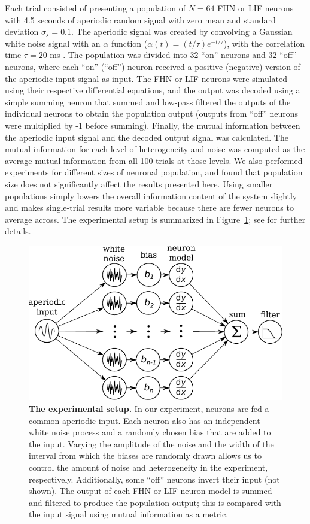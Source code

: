 \documentclass[12pt]{article}
\begin{document}
Each trial consisted of presenting a population of $N = 64$ FHN or LIF neurons with 4.5 seconds of aperiodic random signal with zero mean and standard deviation $\sigma_s = 0.1$.
The aperiodic signal was created by convolving a Gaussian white noise signal with an $\alpha$ function ($\alpha(t) = (t / \tau) e^{-t / \tau}$), with the correlation time $\tau = 20$ ms \citep{Mainen1995}.
The population was divided into 32 ``on'' neurons and 32 ``off'' neurons, where each ``on'' (``off'') neuron received a positive (negative) version of the aperiodic input signal as input. The FHN or LIF neurons were simulated using their respective differential equations, and the output was decoded using a simple summing neuron that summed and low-pass filtered the outputs of the individual neurons to obtain the population output (outputs from ``off'' neurons were multiplied by -1 before summing). Finally, the mutual information between the aperiodic input signal and the decoded output signal was calculated. The mutual information for each level of heterogeneity and noise was computed as the average mutual information from all 100 trials at those levels.
We also performed experiments for different sizes of neuronal population, and found that population size does not significantly affect the results presented here. Using smaller populations simply lowers the overall information content of the system slightly and makes single-trial results more variable because there are fewer neurons to average across.
The experimental setup is summarized in Figure~\ref{fig:exp}; see \textsc{} for further details.

\begin{figure}
  \ifx\hidefigures\undefined
    \centering
    \includegraphics{figure1_experiment.pdf}
  \fi
  \caption{
    \textbf{The experimental setup.} In our experiment, neurons are fed a common aperiodic input. Each neuron also has an independent white noise process and a randomly chosen bias that are added to the input. Varying the amplitude of the noise and the width of the interval from which the biases are randomly drawn allows us to control the amount of noise and heterogeneity in the experiment, respectively. Additionally, some ``off'' neurons invert their input (not shown). The output of each FHN or LIF neuron model is summed and filtered to produce the population output; this is compared with the input signal using mutual information as a metric.
  }
  \label{fig:exp}
\end{figure}
\end{document}
